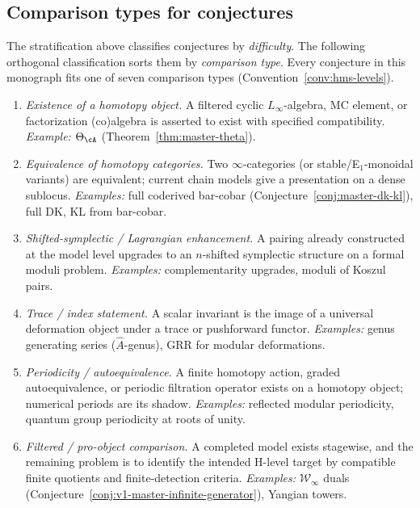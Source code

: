\subsection{Comparison types for conjectures}
\label{subsec:homotopy-templates}

The stratification above classifies conjectures by \emph{difficulty}.
The following orthogonal classification sorts them by
\emph{comparison type}. Every conjecture in this
monograph fits one of seven comparison types
(Convention~\ref{conv:hms-levels}).

\begin{convention}\label{conv:homotopy-templates}
\begin{enumerate}[label=\textbf{Type \Roman*.}, leftmargin=3em]
\item \emph{Existence of a homotopy object.}
 A filtered cyclic $L_\infty$-algebra, MC element,
 or factorization (co)algebra is asserted to exist with specified
 compatibility. \emph{Example:}
 $\Theta_{\cA}$ (Theorem~\ref{thm:master-theta}).

\item \emph{Equivalence of homotopy categories.}
 Two $\infty$-categories (or stable/E$_1$-monoidal variants)
 are equivalent; current chain models give a presentation on a
 dense sublocus.
 \emph{Examples:} full coderived bar-cobar
 (Conjecture~\ref{conj:master-dk-kl}),
 full DK, KL from bar-cobar.

\item \emph{Shifted-symplectic / Lagrangian enhancement.}
 A pairing already constructed at the model level upgrades to an
 $n$-shifted symplectic structure on a formal moduli problem.
 \emph{Examples:} complementarity upgrades, moduli of Koszul pairs.

\item \emph{Trace / index statement.}
 A scalar invariant is the image of a universal deformation object
 under a trace or pushforward functor.
 \emph{Examples:} genus generating series ($\hat{A}$-genus),
 GRR for modular deformations.

\item \emph{Periodicity / autoequivalence.}
 A finite homotopy action, graded autoequivalence, or periodic
 filtration operator exists on a homotopy object; numerical periods
 are its shadow.
 \emph{Examples:} reflected modular periodicity,
 quantum group periodicity at roots of unity.

\item \emph{Filtered / pro-object comparison.}
 A completed model exists stagewise, and the remaining
 problem is to identify the intended H-level target by compatible
 finite quotients and finite-detection criteria.
 \emph{Examples:} $\mathcal{W}_\infty$ duals
 (Conjecture~\ref{conj:v1-master-infinite-generator}),
 Yangian towers.


\end{enumerate}
\end{convention}

